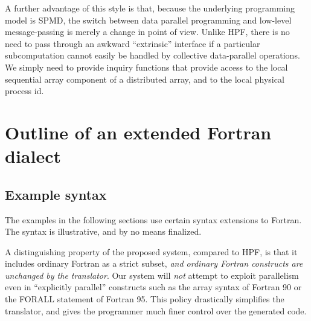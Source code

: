A further advantage of this style is that, because the underlying
programming model is SPMD, the switch between data parallel programming
and low-level message-passing is merely a change in point of view.
Unlike HPF, there is no need to pass through an awkward ``extrinsic''
interface if a particular subcomputation cannot easily be
handled by collective data-parallel operations.  We simply need
to provide inquiry functions that provide access to the local
sequential array component of a distributed array, and to the local
physical process id.


\section{Outline of an extended Fortran dialect}

\subsection{Example syntax}

The examples in the following sections use certain syntax extensions to
Fortran.  The syntax is illustrative, and by no means finalized.

A distinguishing property of the proposed system, compared to HPF, is
that it includes ordinary Fortran as a strict subset, {\em and ordinary
Fortran constructs are unchanged by the translator}.  Our system will
{\em not} attempt to exploit parallelism even in ``explicitly
parallel'' constructs such as the array syntax of Fortran 90 or the
FORALL statement of Fortran 95.  This policy drastically simplifies the
translator, and gives the programmer much finer control over the
generated code.


